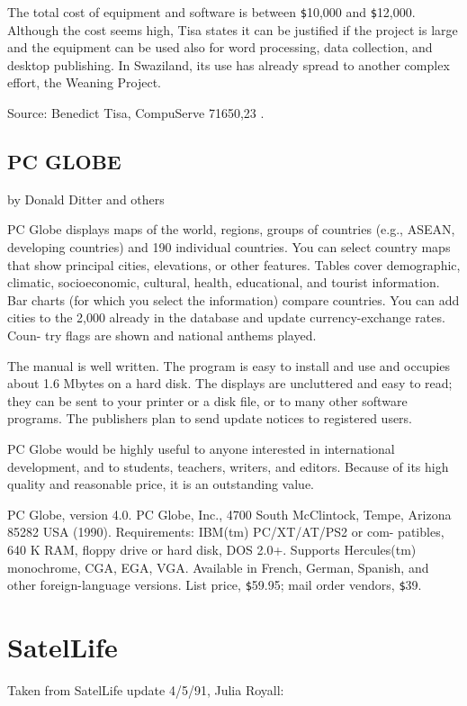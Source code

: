 The total cost of equipment and software is between \verb+$+10,000 and \verb+$+12,000.
Although the cost seems high, Tisa states it can be justified if the
project is large and the equipment can be used also for word processing,
data collection, and desktop publishing. In Swaziland, its use has
already spread to another complex effort, the Weaning Project.
 
Source: Benedict Tisa, CompuServe 71650,23 .
 
\subsection{PC GLOBE}
by Donald Ditter and others
 
PC Globe displays maps of the world, regions, groups of countries (e.g.,
ASEAN, developing countries) and 190 individual countries. You can
select country maps that show principal cities, elevations, or other
features. Tables cover demographic, climatic, socioeconomic, cultural,
health, educational, and tourist information. Bar charts (for which you
select the information) compare countries. You can add cities to the
2,000 already in the database and update currency-exchange rates. Coun-
try flags are shown and national anthems played.
 
The manual is well written. The program is easy to install and use and
occupies about 1.6 Mbytes on a hard disk. The displays are uncluttered
and easy to read; they can be sent to your printer or a disk file, or to
many other software programs. The publishers plan to send update notices
to registered users.
 
PC Globe would be highly useful to anyone interested in international
development, and to students, teachers, writers, and editors. Because of
its high quality and reasonable price, it is an outstanding value.
 
PC Globe, version 4.0. PC Globe, Inc., 4700 South McClintock, Tempe,
Arizona 85282 USA (1990). Requirements: IBM(tm) PC/XT/AT/PS2 or com-
patibles, 640 K RAM, floppy drive or hard disk, DOS 2.0+. Supports
Hercules(tm) monochrome, CGA, EGA, VGA. Available in French, German,
Spanish, and other foreign-language versions. List price, \verb+$+59.95; mail
order vendors, \verb+$+39.
 
\section{SatelLife}

Taken from SatelLife update 4/5/91, Julia Royall:

